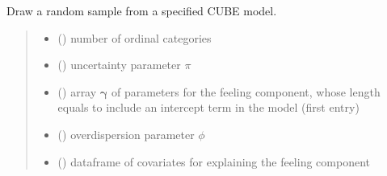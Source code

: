 \documentclass[letterpaper,10pt,english]{sphinxmanual}
\begin{document}

\begin{fulllineitems}
\label{\detokenize{cubmods:cubmods.cube_0w0.draw}}
\pysigstartsignatures
{}
\pysigstopsignatures
\sphinxAtStartPar
Draw a random sample from a specified CUBE model.
\begin{quote}\begin{description}
\begin{itemize}
\item {} 
\sphinxAtStartPar
{} () \textendash{} number of ordinal categories

\item {} 
\sphinxAtStartPar
{} () \textendash{} uncertainty parameter \(\pi\)

\item {} 
\sphinxAtStartPar
{} () \textendash{} array \(\pmb \gamma\) of parameters for the feeling component, whose length equals 
 to include an intercept term in the model (first entry)

\item {} 
\sphinxAtStartPar
{} () \textendash{} overdispersion parameter \(\phi\)

\item {} 
\sphinxAtStartPar
{} () \textendash{} dataframe of covariates for explaining the feeling component


\end{itemize}
\end{description}
\end{quote}
\end{fulllineitems}
\end{document}
